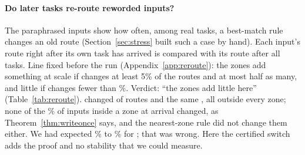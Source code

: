 \begin{table}[t]
  \caption{Spanish-pivot check: \cert{} and the encoder setting (paraphrase ruler, $\alpha = 0.2$) on three pivots, \WidenSpInputs{} paraphrased inputs each; nothing fitted again for Spanish. In \%.}
  \label{tab:widenspanish}
  \centering
  \footnotesize
  \setlength{\tabcolsep}{3pt}
  
\end{table}

\begin{table}[t]
  \caption{The same two rules on \WidenSplitCount{} other random splits of the \WidenTasksAll{} tasks, Spanish pivot: mean (smallest to largest), ruler and radius fitted again on each split. In \%.}
  \label{tab:widensplits}
  \centering
  \footnotesize
  
\end{table}

\paragraph{Do later tasks re-route reworded inputs?} The paraphrased inputs show how often, among real tasks, a best-match rule changes an old route (Section~\ref{sec:stress} built such a case by hand). Each input's route right after its own task has arrived is compared with its route after all \WidenTasksEval{} tasks. Line fixed before the run (Appendix~\ref{app:reroute}): the zones add something at scale if \nearest{} changes at least 5\% of the routes and \cert{} at most half as many, and little if \nearest{} changes fewer than \RerouteLimitLow{}\%. Verdict: ``the zones add little here'' (Table~\ref{tab:reroute}). \nearest{} changed \RerouteNearNChanged{} of \RerouteInputs{} routes and \cert{} the same \RerouteCertNChanged{}, all outside every zone; none of the \RerouteCertInZone{}\% of inputs inside a zone at arrival changed, as Theorem~\ref{thm:writeonce} says, and the nearest-zone rule did not change them either. We had expected \RerouteExpectNearLow{}\% to \RerouteExpectNearHigh{}\% for \nearest{}; that was wrong. Here the certified switch adds the proof and no stability that we could measure.

